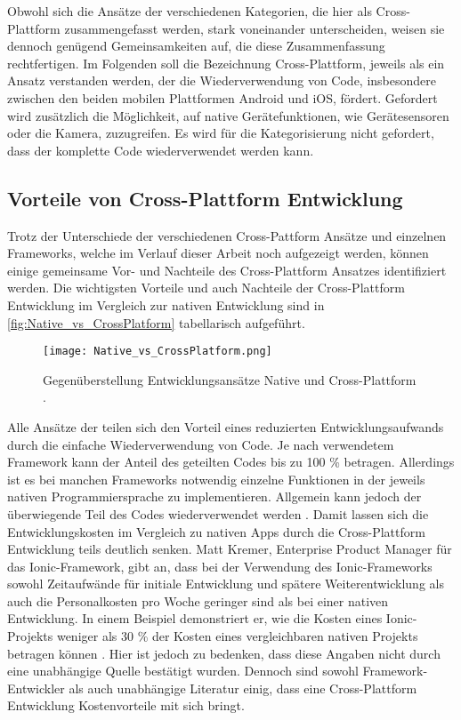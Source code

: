 Obwohl sich die Ansätze der verschiedenen Kategorien, die hier als Cross-Plattform zusammengefasst werden, stark voneinander unterscheiden, weisen sie dennoch genügend Gemeinsamkeiten auf, die diese Zusammenfassung rechtfertigen.
Im Folgenden soll die Bezeichnung Cross-Plattform, jeweils als ein Ansatz verstanden werden, der die Wiederverwendung von Code, insbesondere zwischen den beiden mobilen Plattformen Android und iOS, fördert.
Gefordert wird zusätzlich die Möglichkeit, auf native Gerätefunktionen, wie Gerätesensoren oder die Kamera, zuzugreifen.
Es wird für die Kategorisierung nicht gefordert, dass der komplette Code wiederverwendet werden kann.


\subsection{Vorteile von Cross-Plattform Entwicklung}
\label{sec:CrossPlattform_Vorteile}

Trotz der Unterschiede der verschiedenen Cross-Pattform Ansätze und einzelnen Frameworks, welche im Verlauf dieser Arbeit noch aufgezeigt werden, können einige gemeinsame Vor- und Nachteile des Cross-Plattform Ansatzes identifiziert werden.
Die wichtigsten Vorteile und auch Nachteile der Cross-Plattform Entwicklung im Vergleich zur nativen Entwicklung sind in \autoref{fig:Native_vs_CrossPlatform} tabellarisch aufgeführt.
\begin{figure}[H]
    \centering
    \texttt{[image: Native\_vs\_CrossPlatform.png]}
    \caption{Gegenüberstellung Entwicklungsansätze Native und Cross-Plattform \cite{Manchanda_CrossPlatformFrameworks}.}
    \label{fig:Native_vs_CrossPlatform}
\end{figure}

Alle Ansätze der teilen sich den Vorteil eines reduzierten Entwicklungsaufwands durch die einfache Wiederverwendung von Code.
Je nach verwendetem Framework kann der Anteil des geteilten Codes bis zu 100 \% betragen.
Allerdings ist es bei manchen Frameworks notwendig einzelne Funktionen in der jeweils nativen Programmiersprache zu implementieren.
Allgemein kann jedoch der überwiegende Teil des Codes wiederverwendet werden \cite{Nawrocki_Comparison_Hybrid_Native_Frameworks}.
Damit lassen sich die Entwicklungskosten im Vergleich zu nativen Apps durch die Cross-Plattform Entwicklung teils deutlich senken.
Matt Kremer, Enterprise Product Manager für das Ionic-Framework, gibt an, dass bei der Verwendung des Ionic-Frameworks sowohl Zeitaufwände für initiale Entwicklung und spätere Weiterentwicklung als auch die Personalkosten pro Woche geringer sind als bei einer nativen Entwicklung.
In einem Beispiel demonstriert er, wie die Kosten eines Ionic-Projekts weniger als 30 \% der Kosten eines vergleichbaren nativen Projekts betragen können \cite{Kremer_IonicROI}.
Hier ist jedoch zu bedenken, dass diese Angaben nicht durch eine unabhängige Quelle bestätigt wurden.
Dennoch sind sowohl Framework-Entwickler \cite{Xamarin_Einfuehrung, Kremer_IonicROI} als auch unabhängige Literatur \cite{Pinto_Native_to_Cross_Platform, Que_Comparison_Hybrid_Native, Nawrocki_Comparison_Hybrid_Native_Frameworks} einig, dass eine Cross-Plattform Entwicklung Kostenvorteile mit sich bringt.

